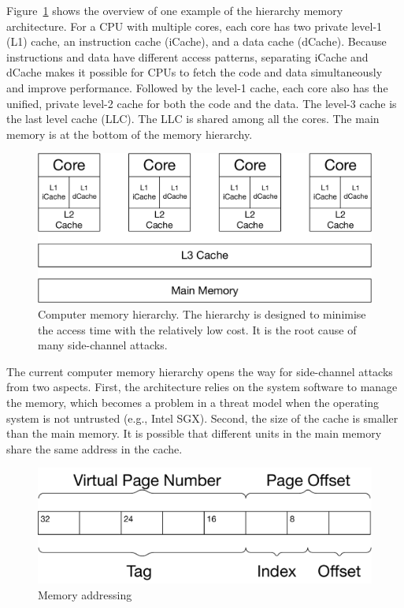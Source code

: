 Figure~\ref{fig:memory_hierarchy} shows the overview of one example of the hierarchy memory architecture. For a CPU with multiple cores, each core has two private level-1 (L1) cache, an instruction cache (iCache), and a data cache (dCache). Because instructions and data have different access patterns, separating iCache and dCache makes it possible for CPUs to fetch the code and data simultaneously and improve performance. Followed by the level-1 cache, each core also has the unified, private level-2 cache for both the code and the data. The level-3 cache is the last level cache (LLC). The LLC is shared among all the cores.
The main memory is at the bottom of the memory hierarchy.
\begin{figure}[ht]
  \centering
  \includegraphics[width=.5\columnwidth]{./figures/chapter3/architecture.pdf}
  \caption{Computer memory hierarchy. The hierarchy is designed to minimise the access time with the relatively low cost. It is the root cause of many side-channel attacks.}\label{fig:memory_hierarchy}
\end{figure}

The current computer memory hierarchy opens the way for side-channel attacks from two aspects. First, the architecture relies on the system software to manage the memory, which becomes a problem in a threat model when the operating system is not untrusted (e.g., Intel SGX). Second, the size of the cache is smaller than the main memory. It is possible that different units in the main memory share the same address in the cache.
\begin{figure}[ht]
  \centering
  \includegraphics[width=.65\columnwidth]{./figures/chapter3/address.pdf}
  \caption{Memory addressing}\label{fig:memory_address}
\end{figure}

